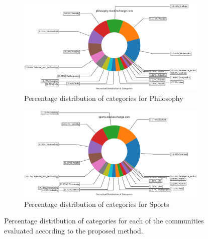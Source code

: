  
\begin{figure}[H]
\ContinuedFloat
     \begin{subfigure}{0.9\textwidth}
    \centering
        \includegraphics[width=1\linewidth]{imgs/percentual-distribution/philosophy_stackexchange_com_donut}
        \caption{Percentage distribution of categories for Philosophy}
        \label{fig:percentage-distribution-philosophy}
    \end{subfigure}%
    
    \par\bigskip %
    \par\bigskip %
    \begin{subfigure}{0.9\textwidth}
    \centering
        \includegraphics[width=1\linewidth]{imgs/percentual-distribution/sports_stackexchange_com_donut}
        \caption{Percentage distribution of categories for Sports}
        \label{fig:percentage-distribution-sports}
    \end{subfigure}
   
 
    \caption{Percentage distribution of categories for each of the communities evaluated according to the proposed method. }
    \label{fig:complete-percentage-distribution}
    
\end{figure}
